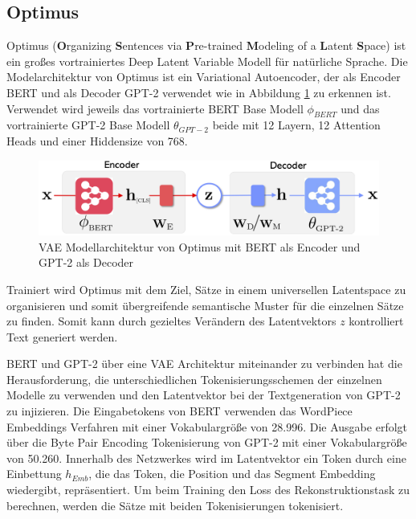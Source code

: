 \subsection{Optimus}
Optimus (\textbf{O}rganizing \textbf{S}entences via \textbf{P}re-trained \textbf{M}odeling of a \textbf{L}atent \textbf{S}pace) \citep{DBLP:journals/corr/abs-2004-04092} ist ein großes vortrainiertes Deep Latent Variable Modell für natürliche Sprache.
Die Modelarchitektur von Optimus ist ein Variational Autoencoder, der als Encoder BERT und als Decoder GPT-2 verwendet wie in Abbildung \ref{optimus_scheme_fig} zu erkennen ist. 
Verwendet wird jeweils das vortrainierte BERT Base Modell $\phi_{BERT}$ und das vortrainierte GPT-2 Base Modell $\theta_{GPT-2}$ beide mit 12 Layern, 12 Attention Heads und einer Hiddensize von 768. 
\begin{figure}[h]
    \centering
    \includegraphics[width=\textwidth]{bilder/optimus_scheme}
    \caption{VAE Modellarchitektur von Optimus mit BERT als Encoder und GPT-2 als Decoder \citep{DBLP:journals/corr/abs-2004-04092}}
    \label{optimus_scheme_fig}
\end{figure}
Trainiert wird Optimus mit dem Ziel, Sätze in einem universellen Latentspace zu organisieren und somit übergreifende semantische Muster für die einzelnen Sätze zu finden.
Somit kann durch gezieltes Verändern des Latentvektors $z$ kontrolliert Text generiert werden. %

BERT und GPT-2 über eine VAE Architektur miteinander zu verbinden hat die Herausforderung, die unterschiedlichen Tokenisierungsschemen der einzelnen Modelle zu verwenden und den Latentvektor bei der Textgeneration von GPT-2 zu injizieren. 
Die Eingabetokens von BERT verwenden das WordPiece Embeddings Verfahren \citep{wordpiece} mit einer Vokabulargröße von 28.996. 
Die Ausgabe erfolgt über die Byte Pair Encoding Tokenisierung \citep{bytepairencoding} von GPT-2 mit einer Vokabulargröße von 50.260. 
Innerhalb des Netzwerkes wird im Latentvektor ein Token durch eine Einbettung $h_{Emb}$, die das Token, die Position und das Segment Embedding wiedergibt, repräsentiert.
Um beim Training den Loss des Rekonstruktionstask zu berechnen, werden die Sätze mit beiden Tokenisierungen tokenisiert.

